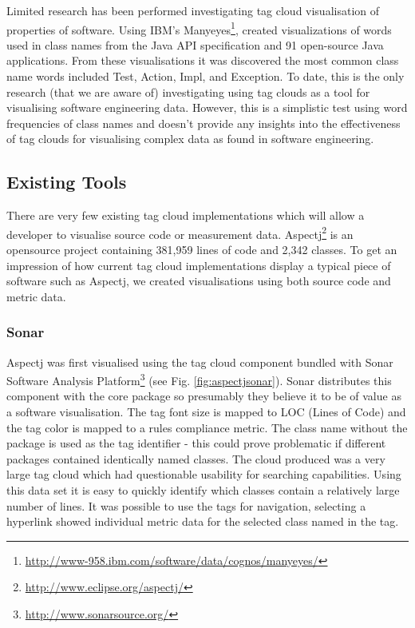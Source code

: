 
Limited research has been performed investigating tag cloud visualisation of properties of software. Using IBM's Manyeyes\footnote{\url{http://www-958.ibm.com/software/data/cognos/manyeyes/}}, \citet{anslow08} created visualizations of words used in class names from the Java API specification and 91 open-source Java applications. From these visualisations it was discovered the most common class name words included Test, Action, Impl, and Exception. To date, this is the only research (that we are aware of) investigating using tag clouds as a tool for visualising software engineering data. However, this is a simplistic test using word frequencies of class names and doesn't provide any insights into the effectiveness of tag clouds for visualising complex data as found in software engineering.

\subsection{Existing Tools}

There are very few existing tag cloud implementations which will allow a developer to visualise source code or measurement data. Aspectj\footnote{\url{http://www.eclipse.org/aspectj/}} is an opensource project containing 381,959 lines of code and 2,342 classes. To get an impression of how current tag cloud implementations display a typical piece of software such as Aspectj, we created visualisations using both source code and metric data.

\subsubsection{Sonar}

Aspectj was first visualised using the tag cloud component bundled with Sonar Software Analysis Platform\footnote{\url{http://www.sonarsource.org/}} (see Fig. \ref{fig:aspectjsonar}). Sonar distributes this component with the core package so presumably they believe it to be of value as a software visualisation. The tag font size is mapped to LOC (Lines of Code) and the tag color is mapped to a rules compliance metric. The class name without the package is used as the tag identifier - this could prove problematic if different packages contained identically named classes. The cloud produced was a very large tag cloud which had questionable usability for searching capabilities. Using this data set it is easy to quickly identify which classes contain a relatively large number of lines. It was possible to use the tags for navigation, selecting a hyperlink showed individual metric data for the selected class named in the tag.

